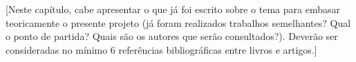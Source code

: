 
[Neste capítulo, cabe apresentar o que já foi escrito sobre o tema para embasar teoricamente o presente projeto (já foram realizados trabalhos semelhantes? Qual o ponto de partida? Quais são os autores que serão consultados?). Deverão ser consideradas no mínimo 6 referências bibliográficas entre livros e artigos.]

